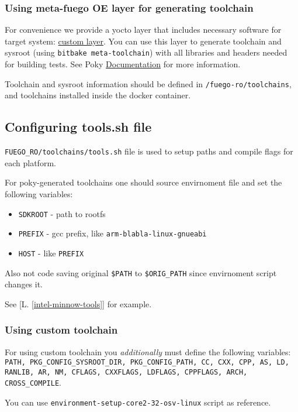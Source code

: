 \subsubsection{Using meta-fuego OE layer for generating toolchain}
For convenience we provide a yocto layer that includes necessary software for target system: \href{https://bitbucket.org/cogentembedded/meta-fuego/}{custom layer}. You can use this layer to generate toolchain and sysroot (using \texttt{bitbake meta-toolchain}) with all libraries and headers needed for building tests. See Poky \href{http://www.yoctoproject.org/docs/1.6/adt-manual/adt-manual.html}{Documentation} for more information.

Toolchain and sysroot information should be defined in \texttt{/fuego-ro/toolchains}, and toolchains installed inside the docker container.

\subsection{Configuring tools.sh file}
\texttt{FUEGO\_RO/toolchains/tools.sh} file is used to setup paths and compile flags for each platform.

For poky-generated toolchains one should source envirnoment file and set the following variables:
\begin{itemize}
\item \texttt{SDKROOT} - path to rootfs
\item \texttt{PREFIX} - gcc prefix, like \texttt{arm-blabla-linux-gnueabi}
\item \texttt{HOST} - like \texttt{PREFIX}
\end{itemize}

Also not code saving original \texttt{\$PATH} to \texttt{\$ORIG\_PATH} since envirnoment script changes it.

See [L. \ref{intel-minnow-tools}] for example.

\subsubsection{Using custom toolchain}
\label {subsec:custom-toolchain-tools-sh}

For using custom toolchain you \emph{additionally} must define the following variables: \texttt{PATH, PKG\_CONFIG\_SYSROOT\_DIR, PKG\_CONFIG\_PATH, CC, CXX, CPP, AS, LD, RANLIB, AR, NM, CFLAGS, CXXFLAGS, LDFLAGS, CPPFLAGS, ARCH, CROSS\_COMPILE}.

You can use \texttt{environment-setup-core2-32-osv-linux} script as reference.


